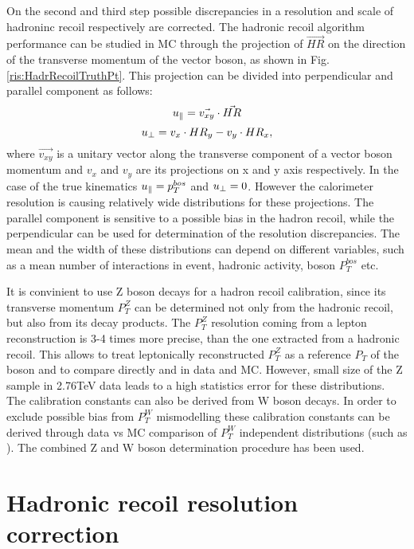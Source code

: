 On the second and third step possible discrepancies in a resolution and scale of hadroninc recoil respectively are corrected. The hadronic recoil algorithm performance can be studied in MC through the projection of $\vec{HR}$ on the direction of the transverse momentum of the vector boson, as shown in Fig. \ref{ris:HadrRecoilTruthPt}. This projection can be divided into perpendicular \uperp and parallel \upar component as follows:
\begin{equation}
u_{\parallel}=\vec{v_{xy}}\cdot\vec{HR}
\end{equation}
\begin{equation}
u_{\perp}=v_x\cdot HR_y - v_y \cdot HR_x,
\end{equation}
where $\vec{v_{xy}}$ is a unitary vector along the transverse component of a vector boson momentum and $v_x$ and $v_y$ are its projections on x and y axis respectively. In the case of the true kinematics $u_{\parallel}=p_T^{bos}$ and $u_{\perp} = 0$. However the calorimeter resolution is causing relatively wide distributions for these projections. The parallel component \upar is sensitive to a possible bias in the hadron recoil, while the perpendicular \uperp can be used for determination of the resolution discrepancies. The mean and the width of these distributions can depend on different variables, such as a mean number of interactions in event, hadronic activity, boson $P_{T}^{bos}$ etc. 

It is convinient to use Z boson decays for a hadron recoil calibration, since its transverse momentum $P_T^Z$ can be determined not only from the hadronic recoil, but also from its decay products.  The $P_T^Z$ resolution coming from a lepton reconstruction is 3-4 times more precise, than the one extracted from a hadronic recoil. This allows to treat leptonically reconstructed $P_T^{Z}$ as a reference $P_T$ of the boson and to compare directly \uperp and \upar in data and MC. However, small size of the Z sample in 2.76TeV data leads to a high statistics error for these distributions. The calibration constants can also be  derived from W boson decays. In order to exclude possible bias from $P_T^W$ mismodelling these calibration constants can be derived through data vs MC comparison of $P_T^{W}$ independent distributions (such as \mtw). The combined Z and W boson determination procedure has been used. 

\section{Hadronic recoil resolution correction}


